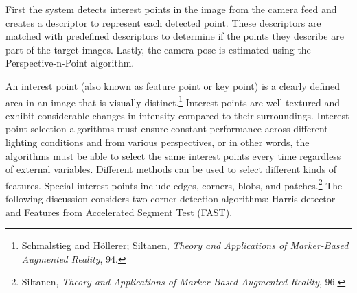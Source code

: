 \begin{figure}[!ht]
\end{figure}
First the system detects interest points in the image from the camera feed and creates a descriptor to represent each detected point. These descriptors are matched with predefined descriptors to determine if the points they describe are part of the target images. Lastly, the camera pose is estimated using the Perspective-n-Point algorithm.

An interest point (also known as feature point or key point) is a clearly defined area in an image that is visually distinct.\footnote{Schmalstieg and Höllerer; Siltanen, \textit{Theory and Applications of Marker-Based Augmented Reality}, 94.} Interest points are well textured and exhibit considerable changes in intensity compared to their surroundings. Interest point selection algorithms must ensure constant performance across different lighting conditions and from various perspectives, or in other words, the algorithms must be able to select the same interest points every time regardless of external variables. Different methods can be used to select different kinds of features. Special interest points include edges, corners, blobs, and patches.\footnote{Siltanen, \textit{Theory and Applications of Marker-Based Augmented Reality}, 96.} The following discussion considers two corner detection algorithms: Harris detector and Features from Accelerated Segment Test (FAST).

